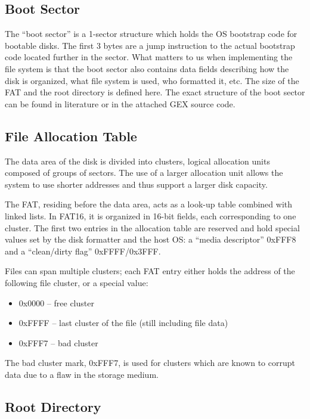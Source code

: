 \subsection{Boot Sector}

The ``boot sector'' is a 1-sector structure which holds the \gls{OS} bootstrap code for bootable disks. The first 3 bytes are a jump instruction to the actual bootstrap code located further in the sector. What matters to us when implementing the file system is that the boot sector also contains data fields describing how the disk is organized, what file system is used, who formatted it, etc. The size of the \gls{FAT} and the root directory is defined here. The exact structure of the boot sector can be found in literature or in the attached GEX source code.

\subsection{File Allocation Table}

The data area of the disk is divided into clusters, logical allocation units composed of groups of sectors. The use of a larger allocation unit allows the system to use shorter addresses and thus support a larger disk capacity.

The \gls{FAT}, residing before the data area, acts as a look-up table combined with linked lists. In FAT16, it is organized in 16-bit fields, each corresponding to one cluster. The first two entries in the allocation table are reserved and hold special values set by the disk formatter and the host \gls{OS}: a ``media descriptor'' 0xFFF8 and a ``clean/dirty flag'' 0xFFFF/0x3FFF.

Files can span multiple clusters; each \gls{FAT} entry either holds the address of the following file cluster, or a special value:

\begin{itemize}[nosep]
	\item 0x0000 -- free cluster
	\item 0xFFFF -- last cluster of the file (still including file data)
	\item 0xFFF7 -- bad cluster
\end{itemize}

The bad cluster mark, 0xFFF7, is used for clusters which are known to corrupt data due to a flaw in the storage medium.

\subsection{Root Directory}

